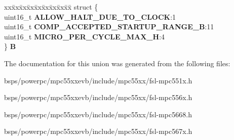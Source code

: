 \begin{DoxyCompactItemize}
\begin{tabbing}
\end{tabbing}\item 
\mbox{\label{unionuPCR26_aad6bfdf53bb8dda7f872367eca783c8b}} 
\begin{tabbing}
xx\=xx\=xx\=xx\=xx\=xx\=xx\=xx\=xx\=\kill
struct \{\\
\>uint16\_t {\bfseries ALLOW\_HALT\_DUE\_TO\_CLOCK}:1\\
\>uint16\_t {\bfseries COMP\_ACCEPTED\_STARTUP\_RANGE\_B}:11\\
\>uint16\_t {\bfseries MICRO\_PER\_CYCLE\_MAX\_H}:4\\
\} {\bfseries B}\\

\end{tabbing}\end{DoxyCompactItemize}


The documentation for this union was generated from the following files\+:\begin{DoxyCompactItemize}
\item 
bsps/powerpc/mpc55xxevb/include/mpc55xx/fsl-\/mpc551x.\+h\item 
bsps/powerpc/mpc55xxevb/include/mpc55xx/fsl-\/mpc556x.\+h\item 
bsps/powerpc/mpc55xxevb/include/mpc55xx/fsl-\/mpc5668.\+h\item 
bsps/powerpc/mpc55xxevb/include/mpc55xx/fsl-\/mpc567x.\+h\end{DoxyCompactItemize}
